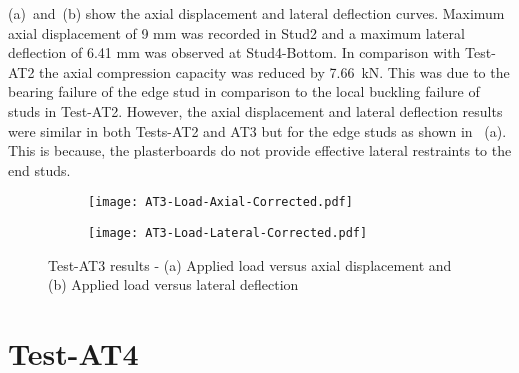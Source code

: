  (a)~and~(b) show the axial displacement and lateral deflection curves. Maximum axial displacement of 9 mm was recorded in Stud2 and a maximum lateral deflection of 6.41 mm was observed at Stud4-Bottom. In comparison with Test-AT2 the axial compression capacity was reduced by 7.66~kN. This was due to the bearing failure of the edge stud in comparison to the local buckling failure of studs in Test-AT2. However, the axial displacement and lateral deflection results were similar in both Tests-AT2 and AT3 but for the edge studs as shown in ~(a). This is because, the plasterboards do not provide effective lateral restraints to the end studs.
\begin{figure}[!htbp]
	\centering
	\begin{subfigure}[b]{0.45\textwidth}
		\centering
		\texttt{[image: AT3-Load-Axial-Corrected.pdf]}
		\caption{}
		\label{subfig:AT3-Load-Axial-Corrected}
	\end{subfigure}
	\begin{subfigure}[b]{0.45\textwidth}
		\centering
		\texttt{[image: AT3-Load-Lateral-Corrected.pdf]}
		\caption{}
		\label{subfig:AT3-Load-Lateral-Corrected}
	\end{subfigure}
	   \caption{Test-AT3 results - (a) Applied load versus axial displacement and (b) Applied load versus lateral deflection}
	   \label{fig:AT3-results}
\end{figure}
\section{Test-AT4}

